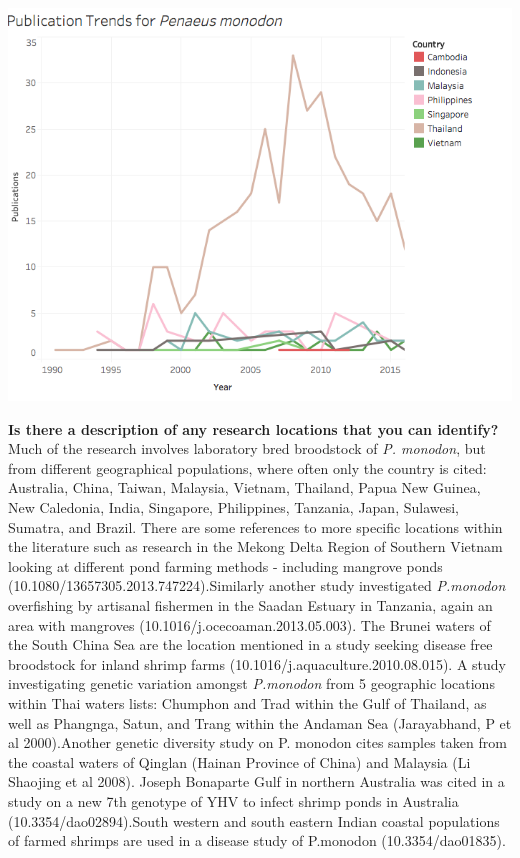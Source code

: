 \documentclass[]{book}
\theoremstyle{definition}
\theoremstyle{definition}
\theoremstyle{definition}
\theoremstyle{remark}
\begin{document}
\includegraphics{images_species/country tends p_mondonpng.png}

\textbf{Is there a description of any research locations that you can
identify?}\\
Much of the research involves laboratory bred broodstock of \emph{P.
monodon}, but from different geographical populations, where often only
the country is cited: Australia, China, Taiwan, Malaysia, Vietnam,
Thailand, Papua New Guinea, New Caledonia, India, Singapore,
Philippines, Tanzania, Japan, Sulawesi, Sumatra, and Brazil. There are
some references to more specific locations within the literature such as
research in the Mekong Delta Region of Southern Vietnam looking at
different pond farming methods - including mangrove ponds
(10.1080/13657305.2013.747224).Similarly another study investigated
\emph{P.monodon} overfishing by artisanal fishermen in the Saadan
Estuary in Tanzania, again an area with mangroves
(10.1016/j.ocecoaman.2013.05.003). The Brunei waters of the South China
Sea are the location mentioned in a study seeking disease free
broodstock for inland shrimp farms (10.1016/j.aquaculture.2010.08.015).
A study investigating genetic variation amongst \emph{P.monodon} from 5
geographic locations within Thai waters lists: Chumphon and Trad within
the Gulf of Thailand, as well as Phangnga, Satun, and Trang within the
Andaman Sea (Jarayabhand, P et al 2000).Another genetic diversity study
on P. monodon cites samples taken from the coastal waters of Qinglan
(Hainan Province of China) and Malaysia (Li Shaojing et al 2008). Joseph
Bonaparte Gulf in northern Australia was cited in a study on a new 7th
genotype of YHV to infect shrimp ponds in Australia
(10.3354/dao02894).South western and south eastern Indian coastal
populations of farmed shrimps are used in a disease study of P.monodon
(10.3354/dao01835).
\end{document}
